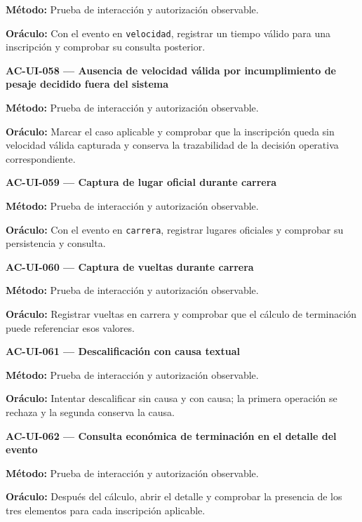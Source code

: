 \documentclass[10pt,letterpaper]{article}
\begin{document}
\textbf{Método:} Prueba de interacción y autorización observable.\par
\textbf{Oráculo:} Con el evento en \texttt{velocidad}, registrar un tiempo válido para una inscripción y comprobar su consulta posterior.\par\vspace{0.45em}
\noindent\textbf{AC-UI-058 --- Ausencia de velocidad válida por incumplimiento de pesaje decidido fuera del sistema}\par
\textbf{Método:} Prueba de interacción y autorización observable.\par
\textbf{Oráculo:} Marcar el caso aplicable y comprobar que la inscripción queda sin velocidad válida capturada y conserva la trazabilidad de la decisión operativa correspondiente.\par\vspace{0.45em}
\noindent\textbf{AC-UI-059 --- Captura de lugar oficial durante carrera}\par
\textbf{Método:} Prueba de interacción y autorización observable.\par
\textbf{Oráculo:} Con el evento en \texttt{carrera}, registrar lugares oficiales y comprobar su persistencia y consulta.\par\vspace{0.45em}
\noindent\textbf{AC-UI-060 --- Captura de vueltas durante carrera}\par
\textbf{Método:} Prueba de interacción y autorización observable.\par
\textbf{Oráculo:} Registrar vueltas en carrera y comprobar que el cálculo de terminación puede referenciar esos valores.\par\vspace{0.45em}
\noindent\textbf{AC-UI-061 --- Descalificación con causa textual}\par
\textbf{Método:} Prueba de interacción y autorización observable.\par
\textbf{Oráculo:} Intentar descalificar sin causa y con causa; la primera operación se rechaza y la segunda conserva la causa.\par\vspace{0.45em}
\noindent\textbf{AC-UI-062 --- Consulta económica de terminación en el detalle del evento}\par
\textbf{Método:} Prueba de interacción y autorización observable.\par
\textbf{Oráculo:} Después del cálculo, abrir el detalle y comprobar la presencia de los tres elementos para cada inscripción aplicable.\par\vspace{0.45em}
\end{document}

